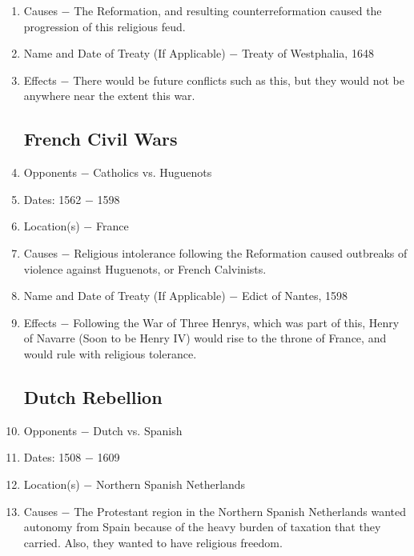 \documentclass[12pt]{article}
\begin{document}
\begin{enumerate}
\item Causes $-$ The Reformation, and resulting counterreformation caused the progression of this religious feud.

\item Name and Date of Treaty (If Applicable) $-$ Treaty of Westphalia, 1648

\item Effects $-$ There would be future conflicts such as this, but they would not be anywhere near the extent this war. 

\subsection{French Civil Wars}
 
\item Opponents $-$ Catholics vs. Huguenots

\item Dates: 1562 $-$ 1598

\item Location(s) $-$ France

\item Causes $-$ Religious intolerance following the Reformation caused outbreaks of violence against Huguenots, or French Calvinists.

\item Name and Date of Treaty (If Applicable) $-$ Edict of Nantes, 1598

\item Effects $-$ Following the War of Three Henrys, which was part of this, Henry of Navarre (Soon to be Henry IV) would rise to the throne of France, and would rule with religious tolerance. 

\subsection{Dutch Rebellion}

\item Opponents $-$ Dutch vs. Spanish

\item Dates: 1508 $-$ 1609

\item Location(s) $-$ Northern Spanish Netherlands

\item Causes $-$ The Protestant region in the Northern Spanish Netherlands wanted autonomy from Spain because of the heavy burden of taxation that they carried. Also, they wanted to have religious freedom. 


\end{enumerate}
\end{document}
